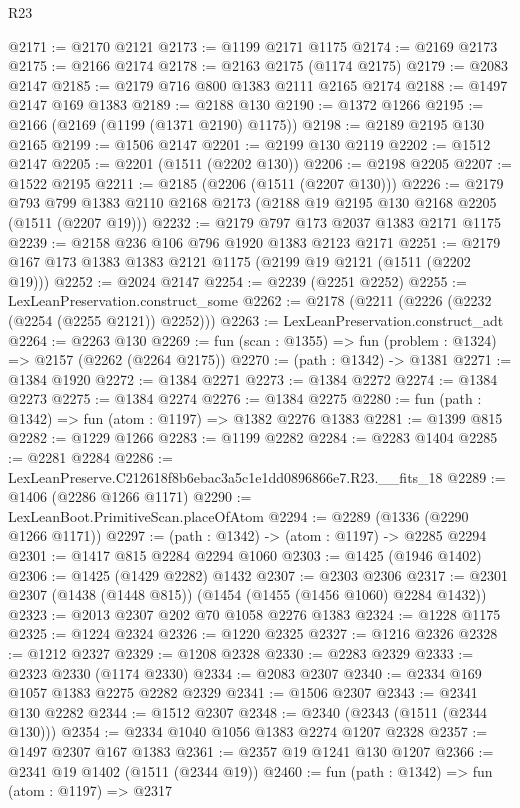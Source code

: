 \begin{lexlean}{R23}
\begin{coremodule}
@2171 := @2170 @2121
@2173 := @1199 @2171 @1175
@2174 := @2169 @2173
@2175 := @2166 @2174
@2178 := @2163 @2175 (@1174 @2175)
@2179 := @2083 @2147
@2185 := @2179 @716 @800 @1383 @2111 @2165 @2174
@2188 := @1497 @2147 @169 @1383
@2189 := @2188 @130
@2190 := @1372 @1266
@2195 := @2166 (@2169 (@1199 (@1371 @2190) @1175))
@2198 := @2189 @2195 @130 @2165
@2199 := @1506 @2147
@2201 := @2199 @130 @2119
@2202 := @1512 @2147
@2205 := @2201 (@1511 (@2202 @130))
@2206 := @2198 @2205
@2207 := @1522 @2195
@2211 := @2185 (@2206 (@1511 (@2207 @130)))
@2226 := @2179
    @793
    @799
    @1383
    @2110
    @2168
    @2173
    (@2188 @19 @2195 @130 @2168 @2205 (@1511 (@2207 @19)))
@2232 := @2179 @797 @173 @2037 @1383 @2171 @1175
@2239 := @2158 @236 @106 @796 @1920 @1383 @2123 @2171
@2251 := @2179 @167 @173 @1383 @1383 @2121 @1175 (@2199 @19 @2121 (@1511 (@2202 @19)))
@2252 := @2024 @2147
@2254 := @2239 (@2251 @2252)
@2255 := LexLeanPreservation.construct_some
@2262 := @2178 (@2211 (@2226 (@2232 (@2254 (@2255 @2121)) @2252)))
@2263 := LexLeanPreservation.construct_adt
@2264 := @2263 @130
@2269 := fun (scan : @1355) => fun (problem : @1324) => @2157 (@2262 (@2264 @2175))
@2270 := (path : @1342) -> @1381
@2271 := @1384 @1920
@2272 := @1384 @2271
@2273 := @1384 @2272
@2274 := @1384 @2273
@2275 := @1384 @2274
@2276 := @1384 @2275
@2280 := fun (path : @1342) => fun (atom : @1197) => @1382 @2276 @1383
@2281 := @1399 @815
@2282 := @1229 @1266
@2283 := @1199 @2282
@2284 := @2283 @1404
@2285 := @2281 @2284
@2286 := LexLeanPreserve.C212618f8b6ebac3a5c1e1dd0896866e7.R23.__fits_18
@2289 := @1406 (@2286 @1266 @1171)
@2290 := LexLeanBoot.PrimitiveScan.placeOfAtom
@2294 := @2289 (@1336 (@2290 @1266 @1171))
@2297 := (path : @1342) -> (atom : @1197) -> @2285 @2294
@2301 := @1417 @815 @2284 @2294 @1060
@2303 := @1425 (@1946 @1402)
@2306 := @1425 (@1429 @2282) @1432
@2307 := @2303 @2306
@2317 := @2301 @2307 (@1438 (@1448 @815)) (@1454 (@1455 (@1456 @1060) @2284 @1432))
@2323 := @2013 @2307 @202 @70 @1058 @2276 @1383
@2324 := @1228 @1175
@2325 := @1224 @2324
@2326 := @1220 @2325
@2327 := @1216 @2326
@2328 := @1212 @2327
@2329 := @1208 @2328
@2330 := @2283 @2329
@2333 := @2323 @2330 (@1174 @2330)
@2334 := @2083 @2307
@2340 := @2334 @169 @1057 @1383 @2275 @2282 @2329
@2341 := @1506 @2307
@2343 := @2341 @130 @2282
@2344 := @1512 @2307
@2348 := @2340 (@2343 (@1511 (@2344 @130)))
@2354 := @2334 @1040 @1056 @1383 @2274 @1207 @2328
@2357 := @1497 @2307 @167 @1383
@2361 := @2357 @19 @1241 @130 @1207
@2366 := @2341 @19 @1402 (@1511 (@2344 @19))
@2460 := fun (path : @1342) =>
  fun (atom : @1197) =>
  @2317

\end{coremodule}
\end{lexlean}
